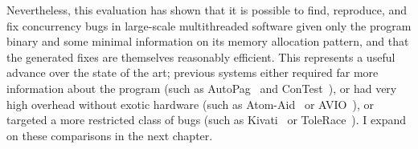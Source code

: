 Nevertheless, this evaluation has shown that it is possible to find,
reproduce, and fix concurrency bugs in large-scale multithreaded
software given only the program binary and some minimal information on
its memory allocation pattern, and that the generated fixes are
themselves reasonably efficient.  This represents a useful advance
over the state of the art; previous systems either required far more
information about the program (such as AutoPag~\cite{Lin2007} and
ConTest~\cite{Krena2007}), or had very high overhead without exotic
hardware (such as Atom-Aid~\cite{Lucia2009} or AVIO~\cite{Lu}), or
targeted a more restricted class of bugs (such as
Kivati~\cite{Chew2010} or ToleRace~\cite{Kirovski2007}).  I expand on
these comparisons in the next chapter.
